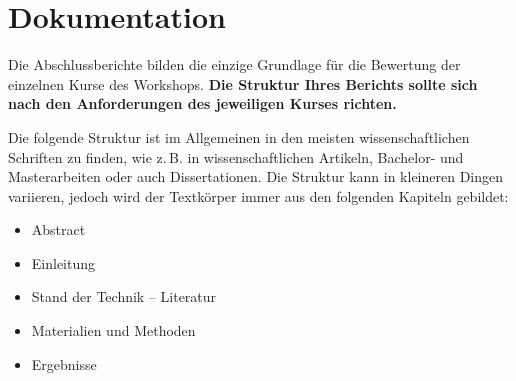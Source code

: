 \section{Dokumentation}
Die Abschlussberichte bilden die einzige Grundlage für die Bewertung der einzelnen Kurse des Workshops. \textbf{Die Struktur Ihres Berichts sollte sich nach den Anforderungen des jeweiligen Kurses richten.}

Die folgende Struktur ist im Allgemeinen in den meisten wissenschaftlichen Schriften zu finden, wie z.\,B. in wissenschaftlichen Artikeln, Bachelor- und Masterarbeiten oder auch Dissertationen. Die Struktur kann in kleineren Dingen variieren, jedoch wird der Textkörper immer aus den folgenden Kapiteln gebildet:
\begin{itemize}
\item Abstract
\item Einleitung
\item Stand der Technik -- Literatur
\item Materialien und Methoden
\item Ergebnisse
\end{itemize}

